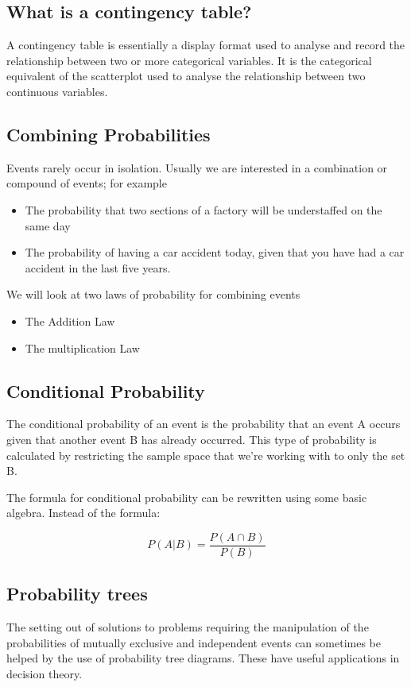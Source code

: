 \subsection*{What is a contingency table?}

A contingency table is essentially a display format used to analyse and record the relationship between two or more categorical variables. It is the categorical equivalent of the scatterplot used to analyse the relationship between two continuous variables.

\subsection{Combining Probabilities}

Events rarely occur in isolation. Usually we are interested in a combination or compound of events; for example
\begin{itemize}
\item The probability that two sections of a factory will be understaffed on the same day 
\item The probability of having a car accident today, given that you have had a car accident in the last five years.
\end{itemize}	

We will look at two laws of probability for combining events
\begin{itemize}
\item The Addition Law 
\item The multiplication Law
\end{itemize}	


\subsection{Conditional Probability}
The conditional probability of an event is the probability that an event A occurs given that another event B has already occurred. This type of probability is calculated by restricting the sample space that we’re working with to only the set B.

The formula for conditional probability can be rewritten using some basic algebra. Instead of the formula:

\[P(A | B) = \frac{P(A \cap B) }{P( B )}  \]

\subsection{Probability trees}
The setting out of solutions to problems requiring the manipulation of the probabilities of mutually exclusive and independent events can sometimes be helped by the use of probability tree diagrams. These have useful applications in decision theory.

